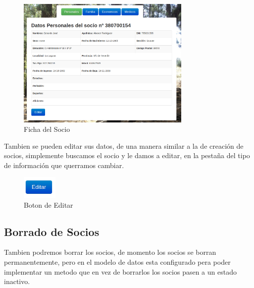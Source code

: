 \begin{figure}[H]
\begin{center}
\includegraphics[width=0.75\textwidth]{images/datos_personales.jpg}
\caption{Ficha del Socio}
\label{fig:ArbolBinario}
\end{center}
\end{figure}

Tambien se pueden editar sus datos, de una manera similar a la de creación de socios, simplemente buscamos el socio y le damos a editar, en la pestaña del tipo de información
que querramos cambiar.\\

\begin{figure}[H]
\begin{center}
\includegraphics[width=0.15\textwidth]{images/boton_editar.jpg}
\caption{Boton de Editar}
\label{fig:ArbolBinario}
\end{center}
\end{figure}

\subsection{Borrado de Socios}
Tambien podremos borrar los socios, de momento los socios se borran permanentemente, pero en el modelo de datos esta configurado pera poder implementar un metodo que en vez de borrarlos los socios pasen
a un estado inactivo.\\


